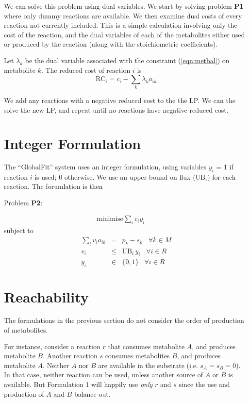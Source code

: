 \documentclass[12pt,twoside,fleqn,a4paper]{article}
\begin{document}
We can solve this problem using dual variables. We start by solving
problem {\bf P1} where only dummy reactions are available. We
then examine dual costs of every reaction not currently included. This
is a simple calculation involving only the cost of the reaction, and the
dual variables of each of the metabolites either used or produced by
the reaction (along with the stoichiometric coefficients).

Let $\lambda_k$ be the dual variable associated with the constraint
(\ref{eqn:metbal}) on metabolite $k$. The reduced cost of reaction $i$
is
\[
\mbox{RC}_i = c_i - \sum_k{\lambda_k a_{ik}} \label{eqn:rc1}
\]

We add any reactions with a negative reduced cost to the the LP.  We
can the solve the new LP, and repeat until no reactions have negative
reduced cost.

\section{Integer Formulation}

The ``GlobalFit'' system uses an integer formulation, using variables
$y_i$ = 1 if reaction $i$ is used; 0 otherwise. We use an upper bound
on flux ($\mbox{UB}_i$) for each reaction. The forumlation is then

Problem {\bf P2}:

\begin{eqnarray}
  \mbox{minimise} \sum_i c_i y_i & & 
\end{eqnarray}
subject to
\begin{eqnarray}
  \sum_i v_i a_{ik} & = & p_k - s_k \;\;\; \forall k \in M \label{eqn:metbal2} \\
  v_i & \le & \mbox{UB}_i \,  y_i \;\;\; \forall i \in R \\
  y_i & \in & \{0, 1\} \;\;\; \forall i \in R 
\end{eqnarray}

\section{Reachability}

The formulations in the previous section do not consider the order of
production of metabolites.

For instance, consider a reaction $r$ that consumes metabolite $A$, and
produces metabolite $B$. Another reaction $s$ consumes metabolites $B$, and
produces metabolite $A$. Neither $A$ nor $B$ are available in the
substrate (i.e. $s_A = s_B = 0$). In that case, neither reaction can
be used, unless another source of $A$ or $B$ is available. But
Formulation 1 will happily use \emph{only} $r$ and $s$ since the use and
production of $A$ and $B$ balance out.
\end{document}
